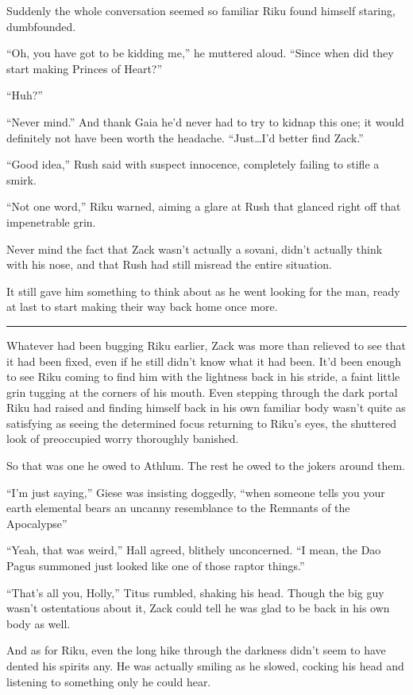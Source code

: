Suddenly the whole conversation seemed so familiar Riku found himself staring, dumbfounded.

``Oh, you have got to be kidding me,'' he muttered aloud. ``Since when did they start making Princes of Heart?''

``Huh?''

``Never mind.'' And thank Gaia he'd never had to try to kidnap this one; it would definitely not have been worth the headache. ``Just\ldots I'd better find Zack.''

``Good idea,'' Rush said with suspect innocence, completely failing to stifle a smirk.

``Not one word,'' Riku warned, aiming a glare at Rush that glanced right off that impenetrable grin.

Never mind the fact that Zack wasn't actually a sovani, didn't actually think with his nose, and that Rush had still misread the entire situation.

It still gave him something to think about as he went looking for the man, ready at last to start making their way back home once more.

\fancybreak{\pfbreakdisplay}


Whatever had been bugging Riku earlier, Zack was more than relieved to see that it had been fixed, even if he still didn't know what it had been. It'd been enough to see Riku coming to find him with the lightness back in his stride, a faint little grin tugging at the corners of his mouth. Even stepping through the dark portal Riku had raised and finding himself back in his own familiar body wasn't quite as satisfying as seeing the determined focus returning to Riku's eyes, the shuttered look of preoccupied worry thoroughly banished.

So that was one he owed to Athlum. The rest he owed to the jokers around them.

``I'm just saying,'' Giese was insisting doggedly, ``when someone tells you your earth elemental bears an uncanny resemblance to the Remnants of the Apocalypse\textemdash ''

``Yeah, that was weird,'' Hall agreed, blithely unconcerned. ``I mean, the Dao Pagus summoned just looked like one of those raptor things.''

``That's all you, Holly,'' Titus rumbled, shaking his head. Though the big guy wasn't ostentatious about it, Zack could tell he was glad to be back in his own body as well.

And as for Riku, even the long hike through the darkness didn't seem to have dented his spirits any. He was actually smiling as he slowed, cocking his head and listening to something only he could hear.

